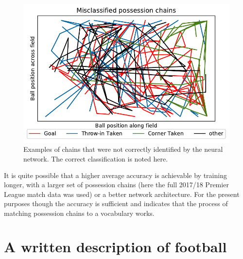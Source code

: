 \documentclass[10pt, a4paper]{UUThesisTemplate}
\begin{document}
\begin{figure}[hb]\centering
\includegraphics[scale=0.8]{figures/misclassified_chains.pdf}
\caption{Examples of chains that were not correctly identified by the neural network. The correct classification is noted here.}\label{fig:misclassifieds}
\end{figure}


It is quite possible that a higher average accuracy is achievable by training longer, with a larger set of possession chains (here the full 2017/18 Premier League match data was used) or a better network architecture. For the present purposes though the accuracy is sufficient and indicates that the process of matching possession chains to a vocabulary works.

\chapter{A written description of football}\label{cha:coarsedata}
\end{document}
